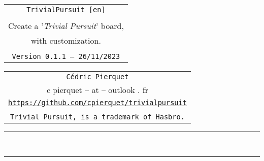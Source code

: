 \documentclass[11pt,a4paper]{ltxdoc}
\def\TPversion{0.1.1}
\def\TPdate{26/11/2023}
\begin{document}
\pagestyle{fancy}

\thispagestyle{empty}

\begin{center}
	\begin{minipage}{0.88\linewidth}
	\begin{tcolorbox}[colframe=yellow,colback=yellow!15]
		\begin{center}
			\begin{tabular}{c}
				{\Huge \texttt{TrivialPursuit [en]}}\\
				\\
				{\LARGE Create a '\textit{Trivial Pursuit}' board,} \\
				{\LARGE with customization.} \\
				\\
				{\small \texttt{Version \TPversion{} -- \TPdate}}
		\end{tabular}
		\end{center}
	\end{tcolorbox}
\end{minipage}
\end{center}

\begin{center}
	\begin{tabular}{c}
	\texttt{Cédric Pierquet}\\
	{\ttfamily c pierquet -- at -- outlook . fr}\\
	\texttt{\url{https://github.com/cpierquet/trivialpursuit}} \\
	\\
	\texttt{Trivial Pursuit\texttrademark, is a trademark of Hasbro.}
\end{tabular}
\end{center}

\hrule

\vfill

\begin{tcolorbox}[colframe=lightgray,colback=lightgray!5]
\BoardTrivialPursuit
\end{tcolorbox}

\vfill~

\pagebreak


\hypertarget{matoc}{}

\tableofcontents

\vspace*{5mm}

\hrule

\vspace*{5mm}
\end{document}
